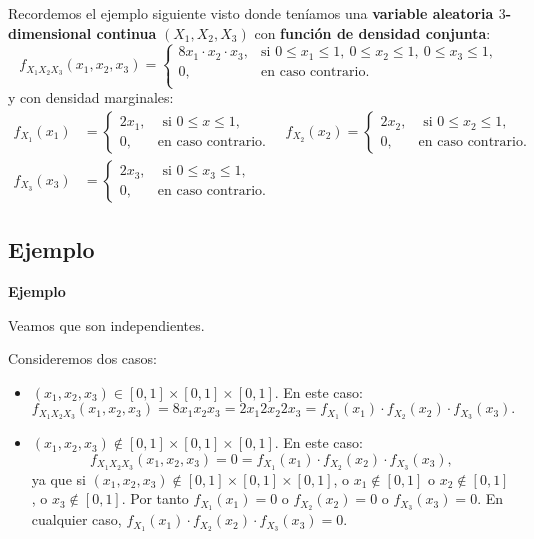 \documentclass[]{book}
\begin{document}
Recordemos el ejemplo siguiente visto donde teníamos una \textbf{variable aleatoria \(3\)-dimensional continua} \((X_1,X_2,X_3)\) con \textbf{función de densidad conjunta}:
\[
f_{X_1X_2X_3}(x_1,x_2,x_3)=\begin{cases}
8 x_1\cdot x_2\cdot x_3, & \mbox{si }0\leq x_1\leq 1,\ 0\leq x_2\leq 1,\ 0\leq x_3\leq 1, \\
0, & \mbox{en caso contrario.}\\
\end{cases}
\]
y con densidad marginales:
\[
\begin{array}{rl}
f_{X_1}(x_1) & =\begin{cases}
2x_1, & \mbox{ si }0\leq x\leq 1,\\
0, & \mbox{en caso contrario.}
\end{cases}\quad f_{X_2}(x_2)=\begin{cases}
2x_2, & \mbox{ si }0\leq x_2\leq 1,\\
0, & \mbox{en caso contrario.}
\end{cases}\\ f_{X_3}(x_3) & =\begin{cases}
2x_3, & \mbox{ si }0\leq x_3\leq 1,\\
0, & \mbox{en caso contrario.}
\end{cases}
\end{array}
\]

\hypertarget{ejemplo-122}{%
\subsection{Ejemplo}\label{ejemplo-122}}

\textbf{Ejemplo}

Veamos que son independientes.

Consideremos dos casos:

\begin{itemize}
\item
  \((x_1,x_2,x_3)\in [0,1]\times [0,1]\times [0,1]\). En este caso:
  \[
  f_{X_1X_2X_3}(x_1,x_2,x_3) =8 x_1 x_2 x_3 =2 x_1 2 x_2 2 x_3=f_{X_1}(x_1)\cdot f_{X_2}(x_2)\cdot f_{X_3}(x_3).
  \]
\item
  \((x_1,x_2,x_3)\not\in [0,1]\times [0,1]\times [0,1]\). En este caso:
  \[
  f_{X_1X_2X_3}(x_1,x_2,x_3)  =0 = f_{X_1}(x_1)\cdot f_{X_2}(x_2)\cdot f_{X_3}(x_3),
  \]
  ya que si \((x_1,x_2,x_3)\not\in [0,1]\times [0,1]\times [0,1]\), o \(x_1\not\in [0,1]\) o \(x_2\not\in [0,1]\), o \(x_3\not\in [0,1]\). Por tanto \(f_{X_1}(x_1)=0\) o \(f_{X_2}(x_2)=0\) o \(f_{X_3}(x_3)=0\). En cualquier caso, \(f_{X_1}(x_1)\cdot f_{X_2}(x_2)\cdot f_{X_3}(x_3)=0\).
\end{itemize}
\end{document}

